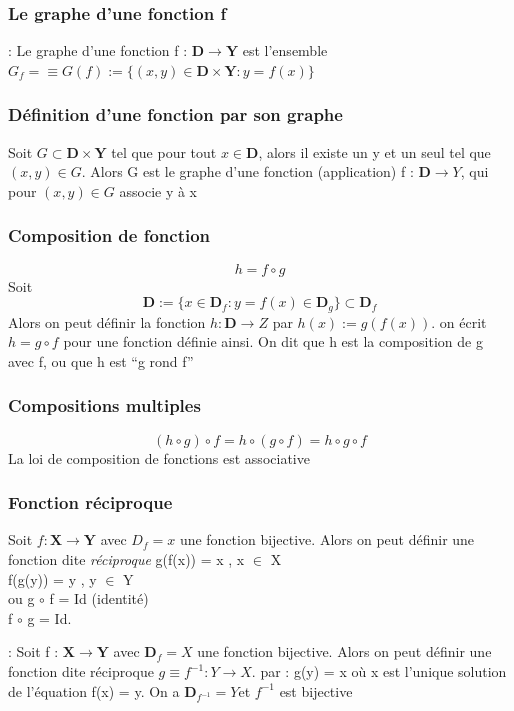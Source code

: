 \documentclass[12pt,a4paper]{article}
\begin{document}
\subsubsection{Le graphe d'une fonction f}
\begin{boite}
\Definition : Le graphe d'une fonction f : $\mathbf{\mathbf{D}} \to \mathbf{Y}$ est l'ensemble $G_f = \equiv G(f) := \{ (x,y) \in \mathbf{\mathbf{D}} \times \mathbf{Y} : y = f(x)\}$
\end{boite}

\subsubsection{Définition d'une fonction par son graphe}
Soit $G \subset \mathbf{\mathbf{D}} \times \mathbf{Y}$ tel que pour tout $x \in \mathbf{D}$, alors il existe un y et un seul tel que $(x,y) \in G$. Alors G est le graphe d'une fonction (application) f : $\mathbf{D} \to Y$, qui pour $(x,y) \in G$ associe y à x
\subsubsection{Composition de fonction}
\begin{equation}
h = f \circ g
\end{equation}
Soit\begin{equation}
\mathbf{D} := \{x \in \mathbf{D}_f : y = f(x) \in \mathbf{D}_g\} \subset \mathbf{D}_f
\end{equation} 
Alors on peut définir la fonction $h : \mathbf{D} \to Z$ par $h(x) := g(f(x))$.
 on écrit  $h = g \circ f$ pour une fonction définie ainsi. On dit que h est la composition de g avec f, ou que h est ``g rond f''
\subsubsection{Compositions multiples}
\begin{equation}
(h \circ g) \circ f = h\circ (g \circ f) = h \circ g \circ f
\end{equation}
La loi de composition de fonctions est associative
\subsubsection{Fonction réciproque}
Soit $f: \mathbf{X} \to \mathbf{Y}$ avec $D_f = x$ une fonction bijective. Alors on peut définir une fonction dite \textit{réciproque}
g(f(x)) = x , x $\in$ X\\
f(g(y)) = y , y $\in$ Y\\
ou g $\circ$ f = Id (identité)\\
f $\circ$ g = Id.\\
\begin{boite}
\Definition : Soit f : $\mathbf{X} \to \mathbf{Y}$ avec $\mathbf{D}_f = X$ une fonction bijective. Alors on peut définir une fonction dite réciproque $g\equiv f^{-1} : Y \to X$. par : g(y) = x   où x est l'unique solution de l'équation f(x) = y. On a $\mathbf{D}_{f^{-1}} = Y$et $f^{-1}$ est bijective
\end{boite}
\end{document}
